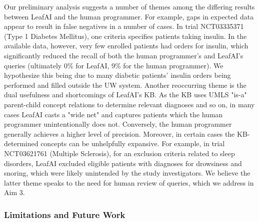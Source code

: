 \documentclass[../main.tex]{subfiles}
\begin{document}
Our preliminary analysis suggests a number of themes among the differing results between LeafAI and the human programmer. For example, gaps in expected data appear to result in false negatives in a number of cases. In trial NCT03335371 (Type 1 Diabetes Mellitus), one criteria specifies patients taking insulin. In the available data, however, very few enrolled patients had orders for insulin, which significantly reduced the recall of both the human programmer's and LeafAI's queries (ultimately 0\% for LeafAI, 9\% for the human programmer). We hypothesize this being due to many diabetic patients' insulin orders being performed and filled outside the UW system. Another reoccurring theme is the dual usefulness and shortcomings of LeafAI's KB. As the KB uses UMLS "is-a" parent-child concept relations to determine relevant diagnoses and so on, in many cases LeafAI casts a "wide net" and captures patients which the human programmer unintentionally does not. Conversely, the human programmer generally achieves a higher level of precision. Moreover, in certain cases the KB-determined concepts can be unhelpfully expansive. For example, in trial NCT03621761 (Multiple Sclerosis), for an exclusion criteria related to sleep disorders, LeafAI excluded eligible patients with diagnoses for drowsiness and snoring, which were likely unintended by the study investigators. We believe the latter theme speaks to the need for human review of queries, which we address in Aim 3.

\subsubsection{Limitations and Future Work}
\end{document}
